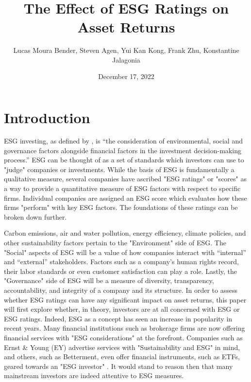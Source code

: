 \documentclass[man,natbib,floatsintext]{apa6}
\title{\textbf{The Effect of ESG Ratings on Asset Returns
} }
\author{Lucas Moura Bender,
Steven Agen,
Yui Kan Kong,
Frank Zhu,
Konstantine Jalagonia
}
\affiliation{ \\ \\ Group E2\\ Applied Statistics and Econometrics I \\ New York University}
\date{December 17, 2022}
\begin{document}


\maketitle


\setcounter{secnumdepth}{3}
\setcounter{tocdepth}{3}

\section{\textbf{Introduction}}
ESG investing, as defined by \citet{msci_2022}, is “the consideration of environmental, social and governance factors alongside financial factors in the investment decision-making process.” ESG can be thought of as a set of standards which investors can use to "judge" companies or investments. While the basis of ESG is fundamentally a qualitative measure, several companies have ascribed "ESG ratings" or "scores" as a way to provide a quantitative measure of ESG factors with respect to specific firms. Individual companies are assigned an ESG score which evaluates how these firms "perform" with key ESG factors. The foundations of these ratings can be broken down further.

Carbon emissions, air and water pollution, energy efficiency, climate policies, and other sustainability factors pertain to the "Environment" side of ESG. The "Social" aspects of ESG will be a value of how companies interact with “internal” and “external” stakeholders. Factors such as a company’s human rights record, their labor standards or even customer satisfaction can play a role. Lastly, the "Governance" side of ESG will be a measure of diversity, transparency, accountability, and integrity of a company and its structure.
In order to assess whether ESG ratings can have any significant impact on asset returns, this paper will first explore whether, in theory, investors are at all concerned with ESG or ESG ratings. Indeed, ESG as a concept has seen an increase in popularity in recent years. Many financial institutions such as brokerage firms are now offering financial services with "ESG considerations" at the forefront. Companies such as Ernst \& Young (EY) advertise services with "Sustainability and ESG" in mind, and others, such as Betterment, even offer financial instruments, such as ETFs, geared towards an "ESG investor" \citep{EY}. It would stand to reason then that many mainstream investors are indeed attentive to ESG measures.
\end{document}
